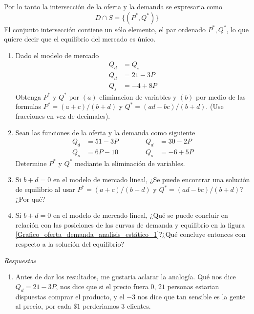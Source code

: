 Por lo tanto la intersección de la oferta y la demanda se expresaria como
\[
D \cap S = \{(P^\ast,Q^\ast)\}
\]
El conjunto intersección contiene un sólo elemento, el par ordenado \(P^\ast, Q^\ast\), lo que quiere decir que el equilibrio del mercado es único.

\begin{ejercicio}
    \begin{enumerate}
        \item Dado el modelo de mercado
        \begin{equation}
            \begin{aligned}
            Q_d &= Q_s \\
            Q_d &= 21-3P \\
            Q_s &= -4+8P
            \end{aligned}
        \end{equation} 
        Obtenga \(P^\ast\) y \(Q^\ast\) por \((a)\) eliminacion de variables y \((b)\) por medio de las formulas \(P^\ast=(a+c)/(b+d)\) y \(Q^\ast= (ad-bc)/(b+d)\). (Use fracciones en vez de decimales).
        \item Sean las funciones de la oferta y la demanda como siguiente
        \begin{equation}
            \begin{aligned}
            Q_d &= 51-3P \qquad \qquad Q_d &= 30-2P \\
            Q_s &= 6P-10 \qquad \qquad Q_s &= -6+5P 
            \end{aligned}
        \end{equation} 
        Determine \(P^\ast\) y \(Q^\ast\) mediante la eliminación de variables.
        \item Si \(b+d = 0\) en el modelo de mercado lineal, ¿Se puede encontrar una solución de equilibrio al usar \(P^\ast=(a+c)/(b+d)\) y \(Q^\ast= (ad-bc)/(b+d)\)?¿Por qué?
        \item Si \(b+d = 0\) en el modelo de mercado lineal, ¿Qué se puede concluir en relación con las posiciones de las curvas de demanda y equilibrio en la figura \ref{Grafico_oferta_demanda_analisis_estático_1}?¿Qué concluye entonces con respecto a la solución del equilibrio?
    \end{enumerate}
    \emph{Respuestas}
    \begin{enumerate}
        \item Antes de dar los resultados, me gustaria aclarar la analogía. Qué nos dice \(Q_d=21-3P\), nos dice que si el precio fuera \(0\), \(21\) personas estarian dispuestas comprar el producto, y el \(-3\) nos dice que tan sensible es la gente al precio, por cada \(\mathdollar{1}\) perderiamos \(3\) clientes.
        

\end{enumerate}
\end{ejercicio}
